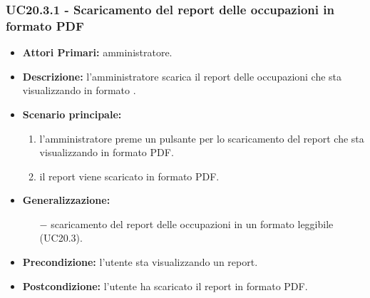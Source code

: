 \subsubsection{ UC20.3.1 - Scaricamento del report delle occupazioni in formato PDF}
\begin{itemize}
	\item\textbf{Attori Primari:} 
	amministratore.
	\item\textbf{Descrizione:} 
	l'amministratore scarica il report delle occupazioni che sta visualizzando in formato .
	\item\textbf{Scenario principale:} 
	\begin{enumerate}
		\item l'amministratore preme un pulsante per lo scaricamento del report che sta visualizzando in formato PDF.
		\item il report viene scaricato in formato PDF.
	\end{enumerate}
	\item\textbf{Generalizzazione:}
	\begin{itemize}
		\item[$-$] scaricamento del report delle occupazioni in un formato leggibile (UC20.3).
	\end{itemize}
	\item\textbf{Precondizione:} 
	l'utente sta visualizzando un report.
	\item\textbf{Postcondizione:}
	l'utente ha scaricato il report in formato PDF.
\end{itemize}


